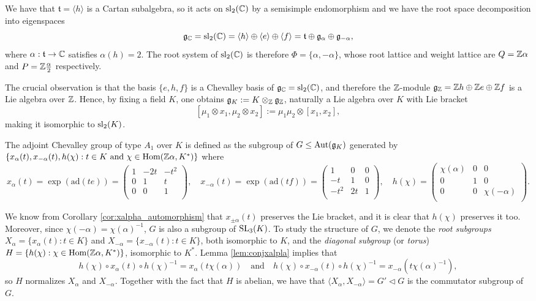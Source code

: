 We have that $\mathfrak{t}=\langle h\rangle$ is a Cartan subalgebra, so it acts on $\mathrm{sl}_2(\mathbb{C})$ by a semisimple endomorphism and we have the root space decomposition into eigenspaces 
$$\mathfrak{g}_{\mathbb{C}}=\mathrm{sl}_2(\mathbb{C})=\langle h\rangle\oplus\langle e\rangle\oplus\langle f\rangle=\mathfrak{t}\oplus\mathfrak{g}_\alpha\oplus\mathfrak{g}_{-\alpha},$$
where $\alpha:\mathfrak{t}\to\mathbb{C}$ satisfies $\alpha(h)=2$. The root system of $\mathrm{sl}_2(\mathbb{C})$ is therefore $\Phi=\{\alpha,-\alpha\}$, whose root lattice and weight lattice are $Q=\mathbb{Z}\alpha$ and $P=\mathbb{Z}\frac{\alpha}{2}$ respectively.

The crucial observation is that the basis $\{e,h,f\}$ is a Chevalley basis of $\mathfrak{g}_{\mathbb{C}}=\mathrm{sl}_2(\mathbb{C})$, and therefore the $\mathbb{Z}$-module $\mathfrak{g}_{\mathbb{Z}}=\mathbb{Z} h\oplus\mathbb{Z} e\oplus\mathbb{Z} f$ is a Lie algebra over $\mathbb{Z}$. Hence, by fixing a field $K$, one obtains $\mathfrak{g}_K:=K\otimes_{\mathbb{Z}}\mathfrak{g}_{\mathbb{Z}}$, naturally a Lie algebra over $K$ with Lie bracket
$$[\mu_1\otimes x_1,\mu_2\otimes x_2]:=\mu_1\mu_2\otimes[x_1,x_2],$$
making it isomorphic to $\mathrm{sl}_2(K)$.

The adjoint Chevalley group of type $A_1$ over $K$ is defined as the subgroup of $G\leq\mathrm{Aut}(\mathfrak{g}_K)$ generated by $\{x_\alpha(t),x_{-\alpha}(t),h(\chi):t\in K\text{ and }\chi\in\mathrm{Hom}(\mathbb{Z}\alpha,K^*)\}$ where
$$x_\alpha(t)=\exp(\mathrm{ad}(te))=\begin{pmatrix}
    1 & -2t & -t^2\\
    0 & 1 & t\\
    0 & 0 & 1\\
\end{pmatrix},\quad x_{-\alpha}(t)=\exp(\mathrm{ad}(tf))=\begin{pmatrix}
    1 & 0 & 0\\
    -t & 1 & 0\\
    -t^2 & 2t & 1\\
\end{pmatrix},\quad h(\chi)=\begin{pmatrix}
    \chi(\alpha) & 0 & 0\\
    0 & 1 & 0\\
    0 & 0 & \chi(-\alpha)\\
\end{pmatrix}.$$

We know from Corollary \ref{cor:xalpha_automorphism} that $x_{\pm\alpha}(t)$ preserves the Lie bracket, and it is clear that $h(\chi)$ preserves it too. Moreover, since $\chi(-\alpha)=\chi(\alpha)^{-1}$, $G$ is also a subgroup of $\mathrm{SL}_3(K)$. To study the structure of $G$, we denote the \textit{root subgroups} $X_\alpha=\{x_\alpha(t):t\in K\}$ and $X_{-\alpha}=\{x_{-\alpha}(t):t\in K\}$, both isomorphic to $K$, and the \textit{diagonal subgroup} (or \textit{torus}) $H=\{h(\chi):\chi\in\mathrm{Hom}(\mathbb{Z}\alpha,K^*)\}$, isomorphic to $K^*$. Lemma \ref{lem:conjxalpla} implies that 
$$h(\chi)\circ x_\alpha(t)\circ h(\chi)^{-1}=x_\alpha(t\chi(\alpha))\quad\text{and}\quad h(\chi)\circ x_{-\alpha}(t)\circ h(\chi)^{-1}=x_{-\alpha}(t\chi(\alpha)^{-1}),$$ so $H$ normalizes $X_\alpha$ and $X_{-\alpha}$. Together with the fact that $H$ is abelian, we have that $\langle X_\alpha,X_{-\alpha}\rangle=G'\triangleleft G$ is the commutator subgroup of $G$. 

